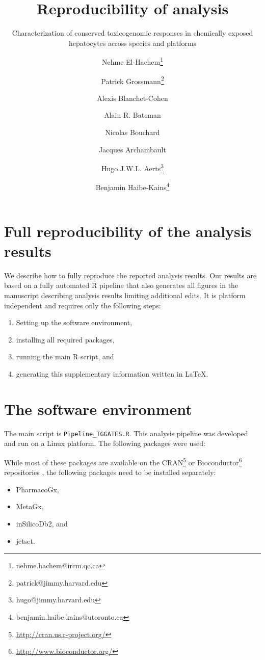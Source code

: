 \documentclass[a4paper,10pt]{scrartcl}
\title{Reproducibility of analysis}
\subtitle{Characterization of conserved toxicogenomic responses in chemically exposed hepatocytes across species and platforms}
\author[i]{Nehme El-Hachem\thanks{nehme.hachem@ircm.qc.ca}}
\author[i]{Patrick Grossmann\thanks{patrick@jimmy.harvard.edu}}
\author[ ]{Alexis Blanchet-Cohen}
\author[ ]{Alain R. Bateman}
\author[ ]{Nicolas Bouchard}
\author[ ]{Jacques Archambault}
\author[ii]{Hugo J.W.L. Aerts\thanks{hugo@jimmy.harvard.edu}}
\author[ii]{Benjamin Haibe-Kains\thanks{benjamin.haibe.kains@utoronto.ca}}
\affil[i]{co-first authors}
\affil[ii]{co-last authors}
\begin{document}
\maketitle

\newpage
\tableofcontents

\newpage

\section{Full reproducibility of the analysis results}

We describe how to fully reproduce the reported analysis results. Our results are based on a fully automated R \cite{rsoftware} pipeline that also generates all figures in the manuscript describing analysis results limiting additional edits. It is platform independent and requires only the following steps:

\begin{enumerate}
\item Setting up the software environment,
\item installing all required packages,
\item running the main R script, and
\item generating this supplementary information written in \LaTeX.
\end{enumerate}

\section{The software environment}

The main script is \verb+Pipeline_TGGATES.R+. This analysis pipeline was developed and run on a Linux platform. The following packages were used:



While most of these packages are available on the CRAN\footnote{\url{http://cran.us.r-project.org/}} or Bioconductor\footnote{\url{http://www.bioconductor.org/}} repositories \cite{bioconductor}, the following packages need to be installed separately:

\begin{itemize}
 \item PharmacoGx,
 \item MetaGx,
 \item inSilicoDb2, and
 \item jetset.
\end{itemize}
\end{document}

